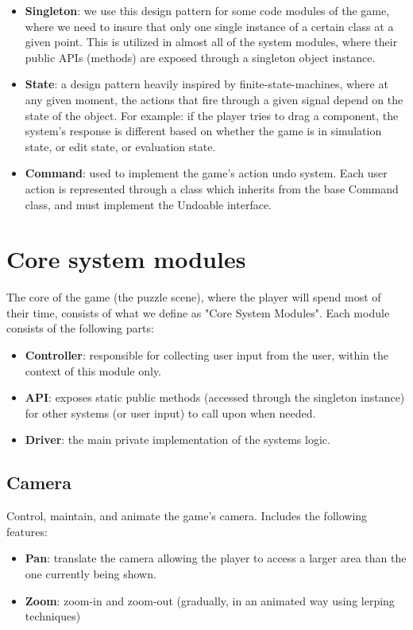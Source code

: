 \documentclass[../main.tex]{subfiles}
\begin{document}
\begin{itemize}
    \item \textbf{Singleton}: we use this design pattern for some code modules of the game, where we need to insure that only one single instance of a certain class at a given point. This is utilized in almost all of the system modules, where their public APIs (methods) are exposed through a singleton object instance.
    \item \textbf{State}: a design pattern heavily inspired by finite-state-machines, where at any given moment, the actions that fire through a given signal depend on the state of the object. For example: if the player tries to drag a component, the system's response is different based on whether the game is in simulation state, or edit state, or evaluation state.
    \item \textbf{Command}: used to implement the game's action undo system. Each user action is represented through a class which inherits from the base Command class, and must implement the Undoable interface.
\end{itemize}

\section{Core system modules}
The core of the game (the puzzle scene), where the player will spend most of their time, consists of what we define as "Core System Modules". Each module consists of the following parts:
\begin{itemize}
    \item \textbf{Controller}: responsible for collecting user input from the user, within the context of this module only. 
    \item \textbf{API}: exposes static public methods (accessed through the singleton instance) for other systems (or user input) to call upon when needed.
    \item \textbf{Driver}: the main private implementation of the systems logic. 
\end{itemize}

\subsection{Camera}
Control, maintain, and animate the game's camera. Includes the following features:
\begin{itemize}
    \item \textbf{Pan}: translate the camera allowing the player to access a larger area than the one currently being shown.
    \item \textbf{Zoom}: zoom-in and zoom-out (gradually, in an animated way using lerping techniques)
\end{itemize}
\end{document}

